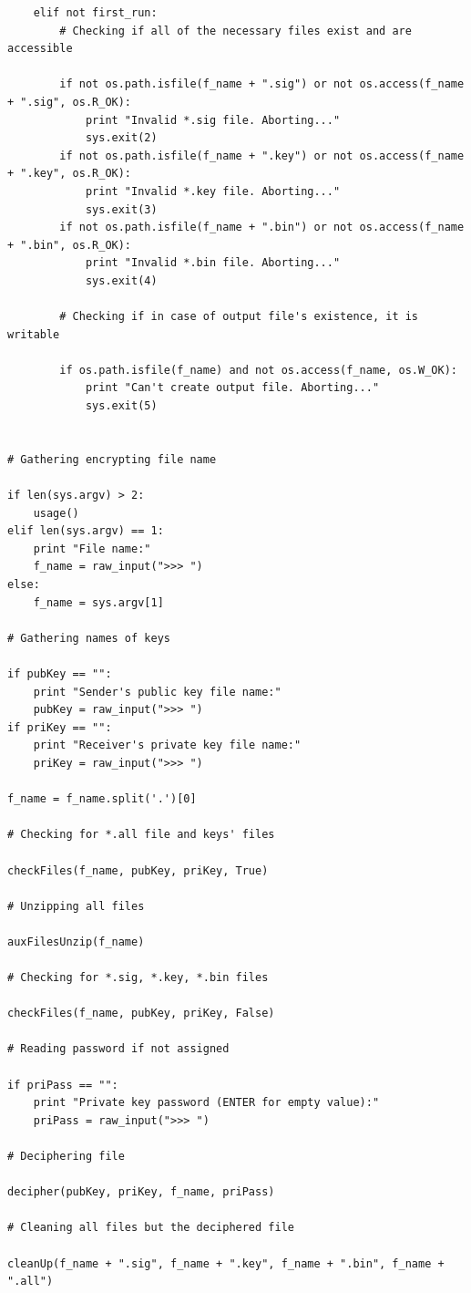 \documentclass[a4paper,11pt,openright,oneside]{report}
\begin{document}
\begin{appendices}
\begin{verbatim}
    elif not first_run:
        # Checking if all of the necessary files exist and are accessible

        if not os.path.isfile(f_name + ".sig") or not os.access(f_name + ".sig", os.R_OK):
            print "Invalid *.sig file. Aborting..."
            sys.exit(2)
        if not os.path.isfile(f_name + ".key") or not os.access(f_name + ".key", os.R_OK):
            print "Invalid *.key file. Aborting..."
            sys.exit(3)
        if not os.path.isfile(f_name + ".bin") or not os.access(f_name + ".bin", os.R_OK):
            print "Invalid *.bin file. Aborting..."
            sys.exit(4)

        # Checking if in case of output file's existence, it is writable

        if os.path.isfile(f_name) and not os.access(f_name, os.W_OK):
            print "Can't create output file. Aborting..."
            sys.exit(5)


# Gathering encrypting file name

if len(sys.argv) > 2:
    usage()
elif len(sys.argv) == 1:
    print "File name:"
    f_name = raw_input(">>> ")
else:
    f_name = sys.argv[1]

# Gathering names of keys

if pubKey == "":
    print "Sender's public key file name:"
    pubKey = raw_input(">>> ")
if priKey == "":
    print "Receiver's private key file name:"
    priKey = raw_input(">>> ")

f_name = f_name.split('.')[0]

# Checking for *.all file and keys' files

checkFiles(f_name, pubKey, priKey, True)

# Unzipping all files

auxFilesUnzip(f_name)

# Checking for *.sig, *.key, *.bin files

checkFiles(f_name, pubKey, priKey, False)

# Reading password if not assigned

if priPass == "":
    print "Private key password (ENTER for empty value):"
    priPass = raw_input(">>> ")

# Deciphering file

decipher(pubKey, priKey, f_name, priPass)

# Cleaning all files but the deciphered file

cleanUp(f_name + ".sig", f_name + ".key", f_name + ".bin", f_name + ".all")
\end{verbatim}
\end{appendices}

\maketitle
\nocite{*}
\printbibliography[title={Referências}]
\end{document}
